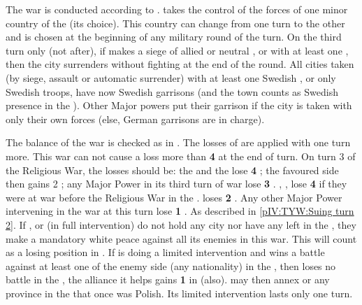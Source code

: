 \phmil
\aparag The war is conducted according to .
\aparag \SUE takes the control of the forces of one minor country of the
\alliance (its choice). This country can change from one turn to the other and
is chosen at the beginning of any military round of the turn.
\aparag On the third turn only (not after), if \SUE makes a siege of allied or
neutral \provinceMecklenburg,  or  with at least one \ARMY \faceplus, then the city surrenders without
fighting at the end of the round.
\aparag All cities taken (by siege, assault or automatic surrender) with at
least one Swedish \ARMY, or only Swedish troops, have now Swedish garrisons
(and the town counts as Swedish presence in the \HRE).  Other Major powers put
their garrison if the city is taken with only their own forces (else, German
garrisons are in charge).

\phpaix
\aparag The balance of the war is checked as in .  The losses of \STAB are applied with one turn more. This war can not
cause a loss more than {\bf 4} \STAB at the end of turn.  On turn 3 of the
Religious War, the losses should be:
\bparag the \alliance and the \ligue lose {\bf 4} \STAB;
\bparag the favoured side then gains 2 \STAB;
\bparag any Major Power in its third turn of war lose {\bf 3} \STAB.
\bparag \SPA, \HOL, \AUS lose {\bf 4} \STAB if they were at war before the
Religious War in the \HRE.
\bparag \SUE loses {\bf 2} \STAB.
\bparag Any other Major Power intervening in the war at this turn lose {\bf 1}
\STAB.
 As described in \ref{pIV:TYW:Suing turn 2}.
\aparag If \SUE, \ENG or \POL (in full intervention) do not hold any city nor
have any \ARMY left in the \HRE, they make a mandatory white peace
against all its enemies in this war. This will count as a losing position in
.
\aparag If \POL is doing a limited intervention and wins a battle against at
least one \ARMY\faceplus of the enemy side (any nationality) in the \HRE, then
loses no battle in the \HRE, the alliance it helps gains {\bf 1} in \STAB
(\AUS also). \POL may then annex  or any province in the
\HRE that once was Polish. Its limited intervention lasts only one turn.

